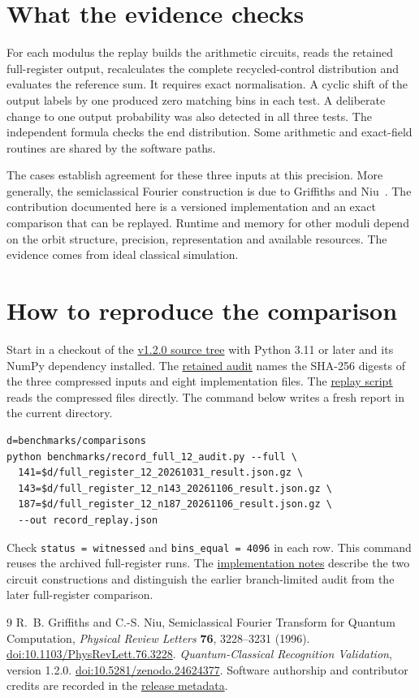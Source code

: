 \documentclass[11pt]{article}
\newcommand{\repo}{https://github.com/Parveen117/quantum-classical-provisional}
\newcommand{\rev}{67478206858dac407198bcd58cc3c3c5663dfd6a}
\newcommand{\datalink}[2]{\href{\repo/blob/\rev/#1}{#2}}
\begin{document}
\newpage
\section*{What the evidence checks}
For each modulus the replay builds the arithmetic circuits, reads the retained full-register output, recalculates the complete recycled-control distribution and evaluates the reference sum. It requires exact normalisation. A cyclic shift of the output labels by one produced zero matching bins in each test. A deliberate change to one output probability was also detected in all three tests. The independent formula checks the end distribution. Some arithmetic and exact-field routines are shared by the software paths.

The cases establish agreement for these three inputs at this precision. More generally, the semiclassical Fourier construction is due to Griffiths and Niu~\cite{gn}. The contribution documented here is a versioned implementation and an exact comparison that can be replayed. Runtime and memory for other moduli depend on the orbit structure, precision, representation and available resources. The evidence comes from ideal classical simulation.

\section*{How to reproduce the comparison}
Start in a checkout of the \href{\repo/tree/\rev}{v1.2.0 source tree} with Python 3.11 or later and its NumPy dependency installed. The \datalink{native_relational_qc/record_full_12_audit.json}{retained audit} names the SHA-256 digests of the three compressed inputs and eight implementation files. The \datalink{benchmarks/record_full_12_audit.py}{replay script} reads the compressed files directly. The command below writes a fresh report in the current directory.

{\small
\begin{verbatim}
d=benchmarks/comparisons
python benchmarks/record_full_12_audit.py --full \
  141=$d/full_register_12_20261031_result.json.gz \
  143=$d/full_register_12_n143_20261106_result.json.gz \
  187=$d/full_register_12_n187_20261106_result.json.gz \
  --out record_replay.json
\end{verbatim}
}
Check \texttt{status = witnessed} and \texttt{bins\_equal = 4096} in each row. This command reuses the archived full-register runs. The \datalink{native_relational_qc/RECORD_PHASE.md}{implementation notes} describe the two circuit constructions and distinguish the earlier branch-limited audit from the later full-register comparison.

\begin{thebibliography}{9}
 R.~B. Griffiths and C.-S. Niu, Semiclassical Fourier Transform for Quantum Computation, \emph{Physical Review Letters} \textbf{76}, 3228--3231 (1996). \href{https://doi.org/10.1103/PhysRevLett.76.3228}{doi:10.1103/PhysRevLett.76.3228}.
\bibitem{software} \emph{Quantum-Classical Recognition Validation}, version 1.2.0. \href{https://doi.org/10.5281/zenodo.24624377}{doi:10.5281/zenodo.24624377}. Software authorship and contributor credits are recorded in the \datalink{CITATION.cff}{release metadata}.
\end{thebibliography}
\end{document}

